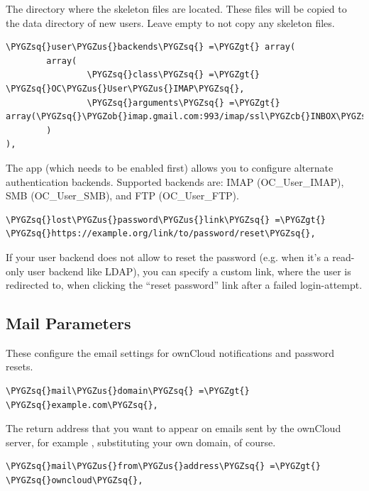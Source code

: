 \documentclass[letterpaper,10pt,english]{sphinxmanual}
\def\PYGZus{\char`\_}
\def\PYGZob{\char`\{}
\def\PYGZcb{\char`\}}
\def\PYGZgt{\char`\>}
\def\PYGZsq{\char`\'}
\renewcommand\PYGZsq{\textquotesingle}
\begin{document}
The directory where the skeleton files are located. These files will be
copied to the data directory of new users. Leave empty to not copy any
skeleton files.

\begin{Verbatim}[commandchars=\\\{\}]
\PYGZsq{}user\PYGZus{}backends\PYGZsq{} =\PYGZgt{} array(
        array(
                \PYGZsq{}class\PYGZsq{} =\PYGZgt{} \PYGZsq{}OC\PYGZus{}User\PYGZus{}IMAP\PYGZsq{},
                \PYGZsq{}arguments\PYGZsq{} =\PYGZgt{} array(\PYGZsq{}\PYGZob{}imap.gmail.com:993/imap/ssl\PYGZcb{}INBOX\PYGZsq{})
        )
),
\end{Verbatim}

The  app (which needs to be enabled first) allows you to
configure alternate authentication backends. Supported backends are:
IMAP (OC\_User\_IMAP), SMB (OC\_User\_SMB), and FTP (OC\_User\_FTP).

\begin{Verbatim}[commandchars=\\\{\}]
\PYGZsq{}lost\PYGZus{}password\PYGZus{}link\PYGZsq{} =\PYGZgt{} \PYGZsq{}https://example.org/link/to/password/reset\PYGZsq{},
\end{Verbatim}

If your user backend does not allow to reset the password (e.g. when it's a
read-only user backend like LDAP), you can specify a custom link, where the
user is redirected to, when clicking the ``reset password'' link after a failed
login-attempt.


\subsection{Mail Parameters}
\label{configuration_server/config_sample_php_parameters:mail-parameters}
These configure the email settings for ownCloud notifications and password
resets.

\begin{Verbatim}[commandchars=\\\{\}]
\PYGZsq{}mail\PYGZus{}domain\PYGZsq{} =\PYGZgt{} \PYGZsq{}example.com\PYGZsq{},
\end{Verbatim}

The return address that you want to appear on emails sent by the ownCloud
server, for example , substituting your own domain,
of course.

\begin{Verbatim}[commandchars=\\\{\}]
\PYGZsq{}mail\PYGZus{}from\PYGZus{}address\PYGZsq{} =\PYGZgt{} \PYGZsq{}owncloud\PYGZsq{},
\end{Verbatim}
\end{document}
